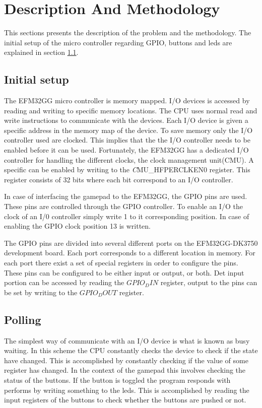 \section{Description And Methodology}
This sections presents the description of the problem and the methodology. The initial setup of the micro controller regarding GPIO, buttons and leds are explained in section \ref{ch:initial_setup}. 




\subsection{Initial setup} \label{ch:initial_setup}
The EFM32GG micro controller is memory mapped. I/O devices is accessed by reading and writing to specific memory locations. The CPU uses normal read and write instructions to communicate with the devices. Each I/O device is given a specific address in the memory map of the device. To save memory only the I/O controller used are clocked. This implies that the the I/O controller needs to be enabled before it can be used. Fortunately, the EFM32GG has a dedicated I/O controller for handling the different clocks, the clock management unit(CMU). A specific can be enabled by writing to the \emph CMU\_HFPERCLKEN0 register. This register consists of 32 bits where each bit correspond to an I/O controller. 

In case of interfacing the gamepad to the EFM32GG, the GPIO pins are used. These pins are controlled through the GPIO controller. To enable an I/O the clock of an I/0 controller simply write 1 to it corresponding position. In case of enabling the GPIO clock position 13 is written. 

The GPIO pins are divided into several different ports on the EFM32GG-DK3750 development board. Each port corresponds to a different location in memory. For each port there exist a set of special registers in order to configure the pins. These pins can be configured to be either input or output, or both. Det input portion can be accessed by reading the $GPIO_DIN$ register, output to the pins can be set by writing to the $GPIO_DOUT$ register.   





\subsection{Polling}\label{ch:polling}
The simplest way of communicate with an I/O device is what is known as busy waiting\cite{micro}. In this scheme the CPU constantly checks the device to check if the state have changed. This is accomplished by constantly checking if the value of some register has changed. In the context of the gamepad this involves checking the status of the buttons. If the button is toggled the program responds with performs by writing something to the leds. This is accomplished by reading the input registers of the buttons to check whether the buttons are pushed or not. 

